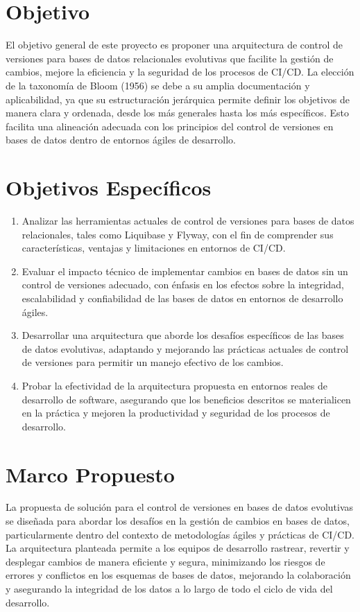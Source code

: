 \documentclass{IEEEtran}
\begin{document}
    
\section{Objetivo}
El objetivo general de este proyecto es proponer una arquitectura de control de versiones para bases de datos relacionales evolutivas que facilite la gestión de cambios, mejore la eficiencia y la seguridad de los procesos de CI/CD. La elección de la taxonomía de Bloom (1956) se debe a su amplia documentación y aplicabilidad, ya que su estructuración jerárquica permite definir los objetivos de manera clara y ordenada, desde los más generales hasta los más específicos. Esto facilita una alineación adecuada con los principios del control de versiones en bases de datos dentro de entornos ágiles de desarrollo.

\section{Objetivos Específicos}
\begin{enumerate}
    \item Analizar las herramientas actuales de control de versiones para bases de datos relacionales, tales como Liquibase y Flyway, con el fin de comprender sus características, ventajas y limitaciones en entornos de CI/CD.
    \item Evaluar el impacto técnico de implementar cambios en bases de datos sin un control de versiones adecuado, con énfasis en los efectos sobre la integridad, escalabilidad y confiabilidad de las bases de datos en entornos de desarrollo ágiles.
    \item Desarrollar una arquitectura que aborde los desafíos específicos de las bases de datos evolutivas, adaptando y mejorando las prácticas actuales de control de versiones para permitir un manejo efectivo de los cambios.
    \item Probar la efectividad de la arquitectura propuesta en entornos reales de desarrollo de software, asegurando que los beneficios descritos se materialicen en la práctica y mejoren la productividad y seguridad de los procesos de desarrollo.
\end{enumerate}

\section{Marco Propuesto}
La propuesta de solución para el control de versiones en bases de datos evolutivas se diseñada para abordar los desafíos en la gestión de cambios en bases de datos, particularmente dentro del contexto de metodologías ágiles y prácticas de CI/CD. La arquitectura planteada permite a los equipos de desarrollo rastrear, revertir y desplegar cambios de manera eficiente y segura, minimizando los riesgos de errores y conflictos en los esquemas de bases de datos, mejorando la colaboración y asegurando la integridad de los datos a lo largo de todo el ciclo de vida del desarrollo.
\end{document}

